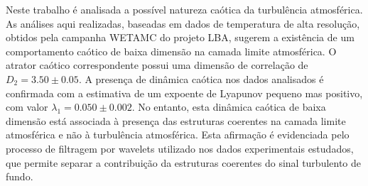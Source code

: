 
\begin{resumo}


\hypertarget{estilo:resumo}{} %

Neste trabalho é analisada a possível natureza caótica da turbulência atmosférica. As análises aqui realizadas, baseadas em dados de temperatura de alta resolução, obtidos pela campanha WETAMC do projeto LBA, sugerem a existência de um comportamento caótico de baixa dimensão na camada limite atmosférica. O atrator caótico correspondente possui uma dimensão de correlação de $D_{2}=3.50\pm0.05$. A presença de dinâmica caótica nos dados analisados é confirmada com a estimativa de um expoente de Lyapunov pequeno mas positivo, com valor $\lambda_{1}=0.050\pm0.002$. No entanto, esta dinâmica caótica de baixa dimensão está associada à presença das estruturas coerentes na camada limite atmosférica e não à turbulência atmosférica. Esta afirmação é evidenciada pelo processo de filtragem por wavelets utilizado nos dados experimentais estudados, que permite separar a contribuição da estruturas coerentes do sinal turbulento de fundo.

 
\end{resumo}
